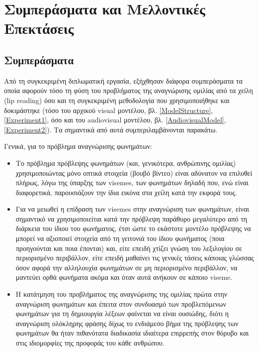 \section{Συμπεράσματα και Μελλοντικές Επεκτάσεις}
\label{ConclusionsFuture}
\subsection{Συμπεράσματα}
\label{Conclusions}
Από τη συγκεκριμένη διπλωματική εργασία, εξήχθησαν διάφορα συμπεράσματα τα οποία αφορούν τόσο τη φύση του προβλήματος της αναγνώρισης ομιλίας από τα χείλη (lip reading) όσο και τη συγκεκριμένη μεθοδολογία που χρησιμοποιήθηκε και δοκιμάστηκε (τόσο του αρχικού visual μοντέλου, βλ. \ref{ModelStructure}, \ref{Experiment1},  όσο και του audiovisual μοντέλου, βλ. \ref{AudiovisualModel}, \ref{Experiment2}). Τα σημαντικά από αυτά συμπεριλαμβάνονται παρακάτω.

Γενικά, για το πρόβλημα αναγνώρισης φωνημάτων:

\begin{itemize}
\item Το πρόβλημα πρόβλεψης φωνημάτων (και, γενικότερα, ανθρώπινης ομιλίας) χρησιμοποιώντας μόνο οπτικά στοιχεία (βουβό βίντεο) είναι αδύνατον να επιλυθεί πλήρως, λόγω της ύπαρξης των visemes, των φωνημάτων δηλαδή που, ενώ είναι διαφορετικά, παρουσιάζουν την ίδια εικόνα στα χείλη κατά την εκφορά τους.

\item Για να μειωθεί η επίδραση των visemes στην αναγνώριση των φωνημάτων, είναι σημαντικό να χρησιμοποιείται κατά την πρόβλεψη παράθυρο μεγαλύτερο από τη διάρκεια του ίδιου του φωνήματος, έτσι ώστε το εκάστοτε μοντέλο πρόβλεψης να μπορεί να αξιοποιεί στοιχεία από τη γειτονιά του ίδιου φωνήματος (ποια προηγούνται και ποια έπονται) και, είτε επειδή χτίζει γνώση του λεξιλογίου σε περιορισμένο περιβάλλον, είτε επειδή μαθαίνει τις γενικές τάσεις κάποιας γλώσσας όσον αφορά την αλληλουχία φωνημάτων σε μη περιορισμένο περιβάλλον, να μαντεύει ορθά φωνήματα ακόμα και όταν αυτά ανήκουν σε κάποιο viseme.

\item Η κατάτμηση του προβλήματος της αναγνώρισης της ομιλίας πρώτα στην αναγνώριση φωνημάτων και έπειτα στον συνδυασμό των προβλεπόμενων φωνημάτων για τη δημιουργία λέξεων φαίνεται να είναι ουσιώδης, διότι η αναγνώριση ολόκληρης φράσης δίχως το ενδιάμεσο βήμα της πρόβλεψης των φωνημάτων θα ήταν πιθανότατα διαδικασία ιδιαίτερα επιρρεπής στον θόρυβο και στις ιδιομορφίες της προφοράς του κάθε ανθρώπου.
\end{itemize}

